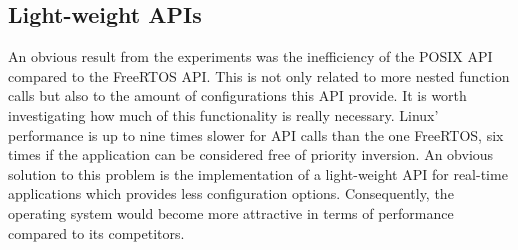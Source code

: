 \subsection{Light-weight APIs}
An obvious result from the experiments was the inefficiency of the POSIX \ac{API} compared to the FreeRTOS \ac{API}.
This is not only related to more nested function calls but also to the amount of configurations this \ac{API} provide.
It is worth investigating how much of this functionality is really necessary.
Linux' performance is up to nine times slower for \ac{API} calls than the one FreeRTOS, six times if the application can be considered free of priority inversion.
An obvious solution to this problem is the implementation of a light-weight \ac{API} for real-time applications which provides less configuration options.
Consequently, the operating system would become more attractive in terms of performance compared to its competitors.